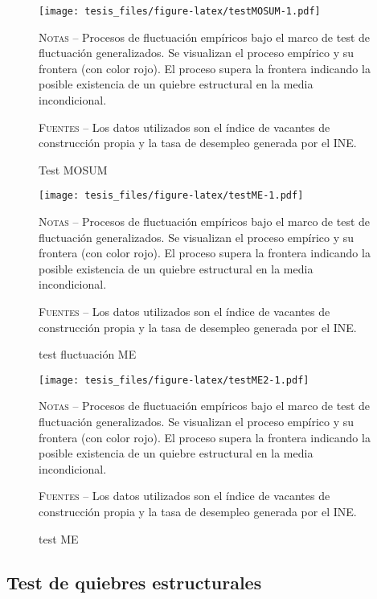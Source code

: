 \documentclass[12pt,oneside]{reedthesis}
\makeatletter
\def\maxwidth{ %
  \ifdim\Gin@nat@width>\linewidth
    \linewidth
  \else
    \Gin@nat@width
  \fi
}
\makeatother
\begin{document}
\begin{figure}
\texttt{[image: tesis\_files/figure-latex/testMOSUM-1.pdf]}
\caption{Test MOSUM}\label{fig:testMOSUM}\textsc{}

\footnotesize\textsc{Notas} -- Procesos de fluctuación empíricos bajo el marco de test de fluctuación generalizados. Se visualizan el proceso empírico y su frontera (con color rojo). El proceso supera la frontera indicando la posible existencia de un quiebre estructural en la media incondicional.

\textsc{Fuentes} -- Los datos utilizados son el índice de vacantes de construcción propia y la tasa de desempleo generada por el INE.
\end{figure}
\begin{figure}
\texttt{[image: tesis\_files/figure-latex/testME-1.pdf]}
\caption{test fluctuación ME}\label{fig:testME}\textsc{}

\footnotesize\textsc{Notas} -- Procesos de fluctuación empíricos bajo el marco de test de fluctuación generalizados. Se visualizan el proceso empírico y su frontera (con color rojo). El proceso supera la frontera indicando la posible existencia de un quiebre estructural en la media incondicional.

\textsc{Fuentes} -- Los datos utilizados son el índice de vacantes de construcción propia y la tasa de desempleo generada por el INE.
\end{figure}
\begin{figure}
\texttt{[image: tesis\_files/figure-latex/testME2-1.pdf]}
\caption{test ME}\label{fig:testME2}\textsc{}

\footnotesize\textsc{Notas} -- Procesos de fluctuación empíricos bajo el marco de test de fluctuación generalizados. Se visualizan el proceso empírico y su frontera (con color rojo). El proceso supera la frontera indicando la posible existencia de un quiebre estructural en la media incondicional.

\textsc{Fuentes} -- Los datos utilizados son el índice de vacantes de construcción propia y la tasa de desempleo generada por el INE.
\end{figure}
\newpage

\hypertarget{test-de-quiebres-estructurales}{%
\subsection{Test de quiebres estructurales}\label{test-de-quiebres-estructurales}}
\end{document}
